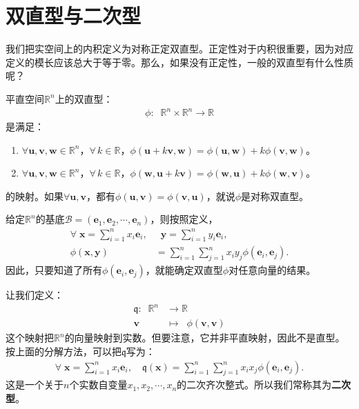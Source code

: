 \documentclass[12pt,UTF8,fontset=none]{ctexbook}
\begin{document}
\section{双直型与二次型}
我们把实空间上的内积定义为对称正定双直型。正定性对于内积很重要，因为对应定义的模长应该总大于等于零。那么，如果没有正定性，一般的双直型有什么性质呢？

\begin{df}
平直空间$\mathbb{R}^n$上的双直型：
\begin{align*}
    \phi:\;\;\mathbb{R}^n \times \mathbb{R}^n \rightarrow \mathbb{R}      
\end{align*}
是满足：
\begin{enumerate}
    \item $\forall \mathbf{u}, \mathbf{v}, \mathbf{w} \in \mathbb{R}^n$，$\forall \, k \in \mathbb{R}$，$\phi(\mathbf{u} + k\mathbf{v}, \mathbf{w}) = \phi(\mathbf{u}, \mathbf{w}) + k \phi(\mathbf{v}, \mathbf{w})$。
    \item $\forall \mathbf{u}, \mathbf{v}, \mathbf{w} \in \mathbb{R}^n$，$\forall \, k \in \mathbb{R}$，$\phi(\mathbf{w}, \mathbf{u} + k\mathbf{v}) = \phi(\mathbf{w},\mathbf{u}) + k \phi(\mathbf{w},\mathbf{v})$。
\end{enumerate}
的映射。如果$\forall \mathbf{u}, \mathbf{v}$，都有$\phi(\mathbf{u}, \mathbf{v}) = \phi(\mathbf{v}, \mathbf{u})$，就说$\phi$是对称双直型。
\end{df}

给定$\mathbb{R}^n$的基底$\mathcal{B} = (\mathbf{e}_1, \mathbf{e}_2, \cdots, \mathbf{e}_n)$，则按照定义，
\begin{align*}
    \forall \;\mathbf{x} = \sum_{i=1}^n x_i\mathbf{e}_i,& \;\;\mathbf{y} = \sum_{i=1}^n y_i\mathbf{e}_i, \\
    \phi(\mathbf{x},\mathbf{y}) &= \sum_{i=1}^n\sum_{j=1}^n x_i y_j \phi(\mathbf{e}_i,\mathbf{e}_j).
\end{align*}
因此，只要知道了所有$\phi(\mathbf{e}_i,\mathbf{e}_j)$，就能确定双直型$\phi$对任意向量的结果。

让我们定义：
\begin{align*}
    \mathfrak{q}:\;\;\mathbb{R}^n  &\rightarrow \mathbb{R}  \\
            \mathbf{v}\;\; &\mapsto \;\; \phi(\mathbf{v}, \mathbf{v})
\end{align*}
这个映射把$\mathbb{R}^n$的向量映射到实数。但要注意，它并非平直映射，因此不是直型。按上面的分解方法，可以把$\mathfrak{q}$写为：
\begin{align*}
    \forall \;\mathbf{x} = \sum_{i=1}^n x_i\mathbf{e}_i,\quad \mathfrak{q}(\mathbf{x}) = \sum_{i=1}^n\sum_{j=1}^n x_i x_j \phi(\mathbf{e}_i,\mathbf{e}_j).
\end{align*}
这是一个关于$n$个实数自变量$x_1,x_2,\cdots,x_n$的二次齐次整式。所以我们常称其为\textbf{二次型}。
\end{document}
